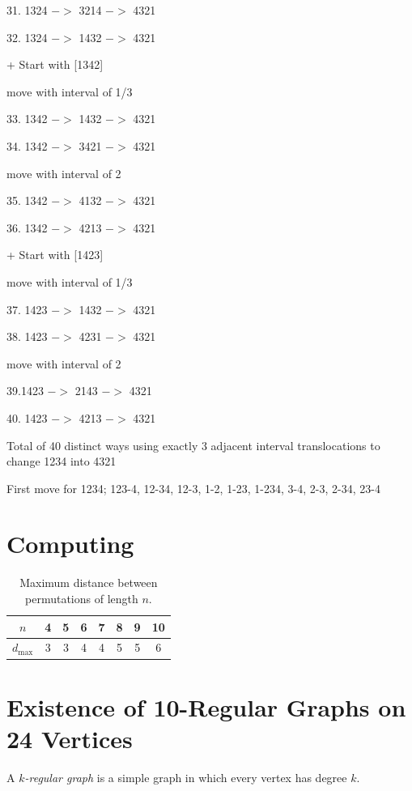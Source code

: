 \documentclass[runningheads]{llncs}
\begin{document}
31. 1324 $->$ 3214 $->$ 4321

32. 1324 $->$ 1432 $->$ 4321

+ Start with [1342]

move with interval of 1/3

33. 1342 $->$ 1432 $->$ 4321

34. 1342 $->$ 3421 $->$ 4321

move with interval of 2

35. 1342 $->$ 4132 $->$ 4321

36. 1342 $->$ 4213 $->$ 4321

+ Start with [1423]

move with interval of 1/3

37. 1423 $->$ 1432 $->$ 4321

38. 1423 $->$ 4231 $->$ 4321

move with interval of 2

39.1423 $->$ 2143 $->$ 4321

40. 1423 $->$ 4213 $->$ 4321

Total of 40 distinct ways using exactly 3 adjacent interval translocations to change 1234 into 4321 

First move for 1234; 123-4, 12-34, 12-3, 1-2, 1-23, 1-234, 3-4, 2-3, 2-34, 23-4  

\section{Computing}

\begin{table}[htb]
\centering
\caption{Maximum distance between permutations of length $n$.}
\begin{tabular}{|c||c|c|c|c|c|c|c|}
\hline
$n$ & 4 & 5 & 6 & 7 & 8 & 9 & 10 \\
\hline
$d_{\max}$ & 3 & 3 & 4 & 4 & 5 & 5 & 6 \\
\hline
\end{tabular}
\end{table}






\newpage


\section*{Existence of 10-Regular Graphs on 24 Vertices}

A \emph{$k$-regular graph} is a simple graph in which every vertex has degree $k$.
\end{document}
